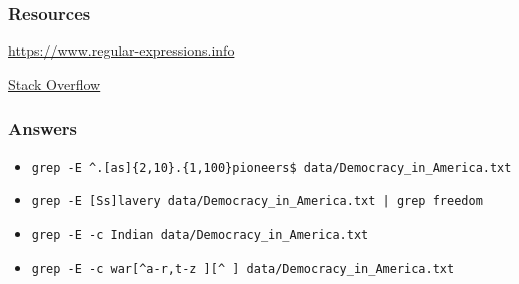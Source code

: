\documentclass{beamer}
\newcommand{\code}[1]{\colorbox{codegray}{\texttt{#1}}}
\begin{document}
\begin{frame}
\frametitle{Resources}

\href{https://www.regular-expressions.info/}{https://www.regular-expressions.info}

\href{https://stackoverflow.com/}{Stack Overflow}

\end{frame}


\begin{frame}
\frametitle{Answers}
\begin{itemize}
    \item \code{grep -E \^{}.[as]\{2,10\}.\{1,100\}pioneers\$ data/Democracy\_in\_America.txt}
    \pause
    \item \code{grep -E [Ss]lavery data/Democracy\_in\_America.txt  | grep freedom}
    \pause
    \item \code{grep -E -c Indian data/Democracy\_in\_America.txt}
    \pause
    \item \code{grep -E -c war[\^{}a-r,t-z\ ][\^{}\ ] data/Democracy\_in\_America.txt}
\end{itemize}
\end{frame}
\end{document}
